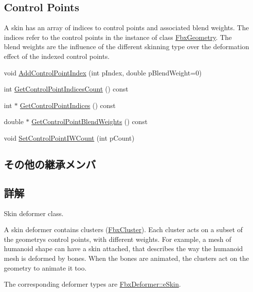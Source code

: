 \subsection*{Control Points}
\label{_amgrpdec32a6075e91e27f43e6aeeb36c8944}%
A skin has an array of indices to control points and associated blend weights. The indices refer to the control points in the instance of class \hyperlink{class_fbx_geometry}{Fbx\+Geometry}. The blend weights are the influence of the different skinning type over the deformation effect of the indexed control points. \begin{DoxyCompactItemize}
\item 
void \hyperlink{class_fbx_skin_a23b0bc74cd2a08e2387d8619f59bb4f3}{Add\+Control\+Point\+Index} (int p\+Index, double p\+Blend\+Weight=0)
\item 
int \hyperlink{class_fbx_skin_ae1a338502f7f4d466d83712eb7750ac8}{Get\+Control\+Point\+Indices\+Count} () const
\item 
int $\ast$ \hyperlink{class_fbx_skin_afbf0703d26ae058ca5757b6051df29a0}{Get\+Control\+Point\+Indices} () const
\item 
double $\ast$ \hyperlink{class_fbx_skin_a08bdcf744096f73b47a1f463ab1a5522}{Get\+Control\+Point\+Blend\+Weights} () const
\item 
void \hyperlink{class_fbx_skin_a7748f1c118ec62548777324a505f6d5d}{Set\+Control\+Point\+I\+W\+Count} (int p\+Count)
\end{DoxyCompactItemize}
\subsection*{その他の継承メンバ}


\subsection{詳解}
Skin deformer class.

A skin deformer contains clusters (\hyperlink{class_fbx_cluster}{Fbx\+Cluster}). Each cluster acts on a subset of the geometry\textquotesingle{}s control points, with different weights. For example, a mesh of humanoid shape can have a skin attached, that describes the way the humanoid mesh is deformed by bones. When the bones are animated, the clusters act on the geometry to animate it too.

The corresponding deformer types are \hyperlink{class_fbx_deformer_a07e2cfb767191ba5c8799fdfbfe3eaf6ae219b2649e29244fe4d80e649241c90e}{Fbx\+Deformer\+::e\+Skin}. 

